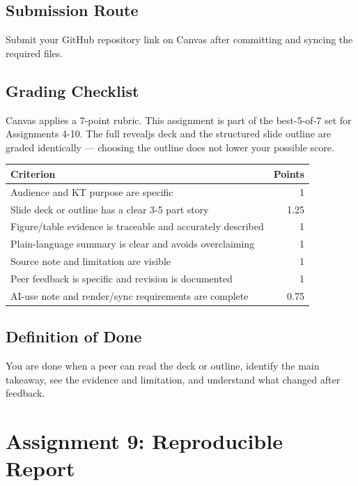 \documentclass[
  letterpaper,
  DIV=11,
  numbers=noendperiod,
  oneside]{scrreprt}
\begin{document}
\section{Submission Route}\label{submission-route-7}

Submit your GitHub repository link on Canvas after committing and
syncing the required files.

\section{Grading Checklist}\label{grading-checklist-7}

Canvas applies a 7-point rubric. This assignment is part of the
best-5-of-7 set for Assignments 4-10. The full revealjs deck and the
structured slide outline are graded identically --- choosing the outline
does not lower your possible score.

\begin{longtable}[]{@{}lr@{}}
\toprule\noalign{}
Criterion & Points \\
\midrule\noalign{}
\endhead
\bottomrule\noalign{}
\endlastfoot
Audience and KT purpose are specific & 1 \\
Slide deck or outline has a clear 3-5 part story & 1.25 \\
Figure/table evidence is traceable and accurately described & 1 \\
Plain-language summary is clear and avoids overclaiming & 1 \\
Source note and limitation are visible & 1 \\
Peer feedback is specific and revision is documented & 1 \\
AI-use note and render/sync requirements are complete & 0.75 \\
\end{longtable}

\section{Definition of Done}\label{definition-of-done-17}

You are done when a peer can read the deck or outline, identify the main
takeaway, see the evidence and limitation, and understand what changed
after feedback.

\chapter{Assignment 9: Reproducible
Report}\label{assignment-9-reproducible-report}
\end{document}
